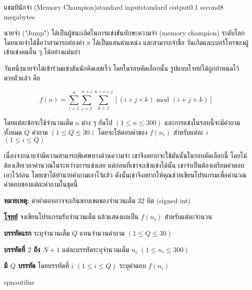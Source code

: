 \documentclass[11pt,a4paper]{article}
\begin{document}
\begin{problem}{แชมป์นักจำ (Memory Champion)}{standard input}{standard output}{0.1 second}{8 megabytes}

นายจำ ("Jump") ได้เป็นผู้ชนะเลิศในการแข่งขันทักษะความจำ (memory champion) ระดับโลก โดยนายจำได้ชื่อว่าสามารถท่องค่า $\pi$ ได้เป็นแสนตำแหน่ง และสามารถจำชื่อ วันเกิดและเบอร์โทรของผู้เข้าแข่งคนอื่น ๆ ได้อย่างแม่นยำ

วันหนึ่งนายจำได้เข้าร่วมแข่งขันนักคิดเลขเร็ว โดยในรอบคัดเลือกนั้น รูปแบบโจทย์ได้ถูกกำหนดไว้ตายตัวแล้ว คือ

$$f(n) = \sum_{i=1}^{n}\sum_{j=1}^{n+i}\sum_{k=1}^{n+i+j} [(i\times j\times k) \text{ mod } (i+j+k)]$$

โดยแต่ละข้อจะใช้จำนวนเต็ม $n$ ต่าง ๆ กันไป $(1 \leq n \leq 300)$ และการแข่งในรอบนี้จะมีคำถามทั้งหมด $Q$ คำถาม $(1 \leq Q \leq 30)$ โดยจะให้ตอบค่าของ $f(n_i)$ สำหรับแต่ละ $i$ $(1 \leq i \leq Q)$

เนื่องจากนายจำมีความสามารถพิเศษทางด้านความจำ เขาจึงอยากจะใช้มันนั้นในรอบคัดเลือกนี้ โดยไม่ต้องเสียเวลาคำนวณในระหว่างการแข่งเลย แต่ก่อนที่เขาจะเข้าแข่งได้นั้น เขาจำเป็นต้องเตรียมคำตอบเอาไว้ก่อน โดยเขาได้ทำนายคำถามเอาไว้แล้ว ดังนั้นเขาจึงอยากให้คุณช่วยเขียนโปรแกรมเพื่อคำนวณคำตอบของแต่ละคำถามในชุดนี้

\textbf{หมายเหตุ:} ค่าคำตอบอาจจะเกินขอบเขตของจำนวนเต็ม 32 บิต (signed int)

\underline{\textbf{โจทย์}} จงเขียนโปรแกรมรับจำนวนเต็ม แล้วแสดงผลเป็น $f(n_i)$ สำหรับแต่ละจำนวน

\InputFile
\textbf{บรรทัดแรก} ระบุจำนวนเต็ม $Q$ แทนจำนวนคำถาม $(1 \leq Q \leq 30)$

\textbf{บรรทัดที่ $2$ ถึง $N+1$} แต่ละบรรทัดระบุจำนวนเต็ม $n_i$ $(1 \leq n_i \leq 300)$

\OutputFile

\textbf{มี $Q$ บรรทัด} โดยบรรทัดที่ $i$ $(1 \leq i \leq Q)$ ระบุคำตอบ $f(n_i)$ 

\Examples

\begin{example}
%
%
\end{example}

\Source

spnautilus

\end{problem}
\end{document}
